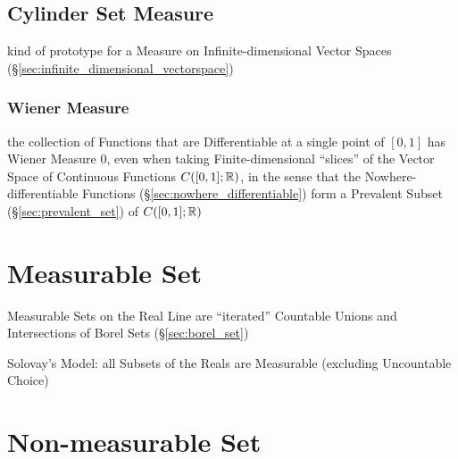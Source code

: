 \subsection{Cylinder Set Measure}\label{sec:cylinder_set_measure}

kind of prototype for a Measure on Infinite-dimensional Vector Spaces
(\S\ref{sec:infinite_dimensional_vectorspace})



\subsubsection{Wiener Measure}\label{sec:wiener_measure}\hfill

the collection of Functions that are Differentiable at a single point of
$[0,1]$ has Wiener Measure $0$, even when taking Finite-dimensional ``slices''
of the Vector Space of Continuous Functions $C([0,1];\mathbb{R})$, in the sense
that the Nowhere-differentiable Functions (\S\ref{sec:nowhere_differentiable})
form a Prevalent Subset (\S\ref{sec:prevalent_set}) of $C([0,1]; \mathbb{R})$



\section{Measurable Set}\label{sec:measurable_set}

Measurable Sets on the Real Line are ``iterated'' Countable Unions and
Intersections of Borel Sets (\S\ref{sec:borel_set})

Solovay's Model: all Subsets of the Reals are Measurable (excluding Uncountable
Choice)



\section{Non-measurable Set}\label{sec:nonmeasurable_set}

